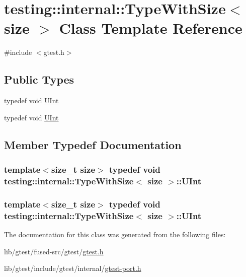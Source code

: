 \hypertarget{classtesting_1_1internal_1_1_type_with_size}{\section{testing\-:\-:internal\-:\-:Type\-With\-Size$<$ size $>$ Class Template Reference}
\label{classtesting_1_1internal_1_1_type_with_size}
}


{\ttfamily \#include $<$gtest.\-h$>$}

\subsection*{Public Types}
\begin{DoxyCompactItemize}
\item 
typedef void \hyperlink{classtesting_1_1internal_1_1_type_with_size_a3898640d9f6c1e18110eef90f47a5d7b}{U\-Int}
\item 
typedef void \hyperlink{classtesting_1_1internal_1_1_type_with_size_a3898640d9f6c1e18110eef90f47a5d7b}{U\-Int}
\end{DoxyCompactItemize}


\subsection{Member Typedef Documentation}
\hypertarget{classtesting_1_1internal_1_1_type_with_size_a3898640d9f6c1e18110eef90f47a5d7b}{
\subsubsection[{U\-Int}]{\setlength{\rightskip}{0pt plus 5cm}template$<$size\-\_\-t size$>$ typedef void {\bf testing\-::internal\-::\-Type\-With\-Size}$<$ size $>$\-::{\bf U\-Int}}}\label{classtesting_1_1internal_1_1_type_with_size_a3898640d9f6c1e18110eef90f47a5d7b}
\hypertarget{classtesting_1_1internal_1_1_type_with_size_a3898640d9f6c1e18110eef90f47a5d7b}{
\subsubsection[{U\-Int}]{\setlength{\rightskip}{0pt plus 5cm}template$<$size\-\_\-t size$>$ typedef void {\bf testing\-::internal\-::\-Type\-With\-Size}$<$ size $>$\-::{\bf U\-Int}}}\label{classtesting_1_1internal_1_1_type_with_size_a3898640d9f6c1e18110eef90f47a5d7b}


The documentation for this class was generated from the following files\-:\begin{DoxyCompactItemize}
\item 
lib/gtest/fused-\/src/gtest/\hyperlink{fused-src_2gtest_2gtest_8h}{gtest.\-h}\item 
lib/gtest/include/gtest/internal/\hyperlink{gtest-port_8h}{gtest-\/port.\-h}\end{DoxyCompactItemize}
